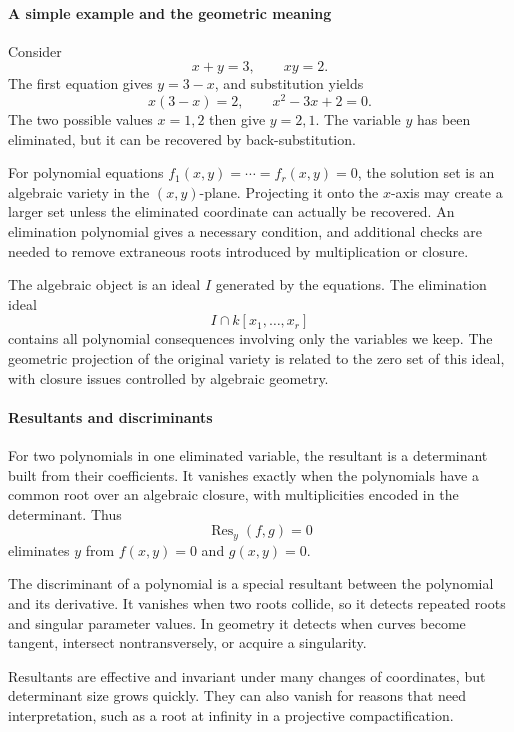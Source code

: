 \paragraph{A simple example and the geometric meaning}

Consider
\[
 x+y=3,\qquad xy=2.
\]
The first equation gives $y=3-x$, and substitution yields
\[
 x(3-x)=2,\qquad x^2-3x+2=0.
\]
The two possible values $x=1,2$ then give $y=2,1$. The variable $y$ has been eliminated, but it can be recovered by back-substitution.

For polynomial equations $f_1(x,y)=\cdots=f_r(x,y)=0$, the solution set is an algebraic variety in the $(x,y)$-plane. Projecting it onto the $x$-axis may create a larger set unless the eliminated coordinate can actually be recovered. An elimination polynomial gives a necessary condition, and additional checks are needed to remove extraneous roots introduced by multiplication or closure.

The algebraic object is an ideal $I$ generated by the equations. The elimination ideal
\[
 I\cap k[x_1,\ldots,x_r]
\]
contains all polynomial consequences involving only the variables we keep. The geometric projection of the original variety is related to the zero set of this ideal, with closure issues controlled by algebraic geometry.

\paragraph{Resultants and discriminants}

For two polynomials in one eliminated variable, the resultant is a determinant built from their coefficients. It vanishes exactly when the polynomials have a common root over an algebraic closure, with multiplicities encoded in the determinant. Thus
\[
 \operatorname{Res}_y(f,g)=0
\]
eliminates $y$ from $f(x,y)=0$ and $g(x,y)=0$.

The discriminant of a polynomial is a special resultant between the polynomial and its derivative. It vanishes when two roots collide, so it detects repeated roots and singular parameter values. In geometry it detects when curves become tangent, intersect nontransversely, or acquire a singularity.

Resultants are effective and invariant under many changes of coordinates, but determinant size grows quickly. They can also vanish for reasons that need interpretation, such as a root at infinity in a projective compactification. \cite{elimination_theory_ref3,elimination_theory_ref4}

